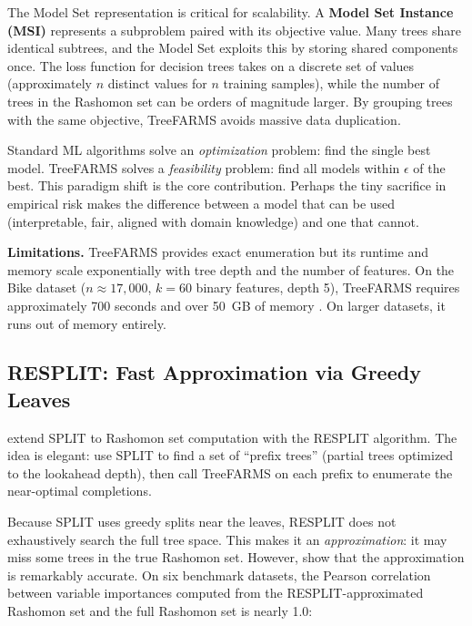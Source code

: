 The Model Set representation is critical for scalability.  A
\textbf{Model Set Instance (MSI)} represents a subproblem paired with its
objective value.  Many trees share identical subtrees, and the Model Set
exploits this by storing shared components once.  The loss function for
decision trees takes on a discrete set of values (approximately $n$ distinct
values for $n$ training samples), while the number of trees in the Rashomon
set can be orders of magnitude larger.  By grouping trees with the same
objective, TreeFARMS avoids massive data duplication.

\begin{keyidea}
Standard ML algorithms solve an \emph{optimization} problem: find the single
best model.  TreeFARMS solves a \emph{feasibility} problem: find all models
within $\epsilon$ of the best.  This paradigm shift is the core contribution.
Perhaps the tiny sacrifice in empirical risk makes the difference between a
model that can be used (interpretable, fair, aligned with domain knowledge)
and one that cannot.
\end{keyidea}

\textbf{Limitations.}  TreeFARMS provides exact enumeration but its runtime
and memory scale exponentially with tree depth and the number of features.
On the Bike dataset ($n \approx 17{,}000$, $k = 60$ binary features, depth
5), TreeFARMS requires approximately 700 seconds and over 50~GB of memory
\citep{HeileBabbar2025}.  On larger datasets, it runs out of memory entirely.

\subsection{RESPLIT: Fast Approximation via Greedy Leaves}
\label{sec:rashomon:resplit}

\citet{BabbarEtAl2025} extend SPLIT to Rashomon set computation with the
RESPLIT algorithm.  The idea is elegant: use SPLIT to find a set of
``prefix trees'' (partial trees optimized to the lookahead depth), then call
TreeFARMS on each prefix to enumerate the near-optimal completions.

Because SPLIT uses greedy splits near the leaves, RESPLIT does not
exhaustively search the full tree space.  This makes it an
\emph{approximation}: it may miss some trees in the true Rashomon set.
However, \citet{BabbarEtAl2025} show that the approximation is remarkably
accurate.  On six benchmark datasets, the Pearson correlation between
variable importances computed from the RESPLIT-approximated Rashomon set
and the full Rashomon set is nearly 1.0:

